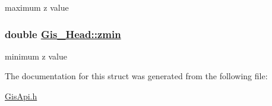 maximum z value 

\hypertarget{structGis__Head_o0}{
\subsubsection[zmin]{\setlength{\rightskip}{0pt plus 5cm}double \hyperlink{structGis__Head_o0}{Gis\_\-Head::zmin}}}
\label{structGis__Head_o0}


minimum z value 



The documentation for this struct was generated from the following file:\begin{CompactItemize}
\item 
\hyperlink{GisApi_8h}{Gis\-Api.h}\end{CompactItemize}

